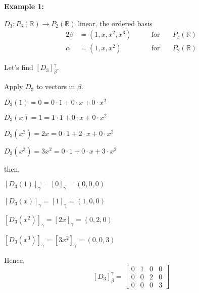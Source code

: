 \documentclass[12pt]{article}
\newcommand{\mR}{{\mathbb{R}}}
\begin{document}
	
	{\color{Brown}
		\textbf{Example 1:}
		
		$D_3 : P_3 (\mR) \to P_2 (\mR)$ linear, the ordered basis
		\begin{alignat*}{2}
			\beta &= (1, x, x^2, x^3) \qquad &\text{for} \quad & P_3(\mR)\\
			\alpha &= (1, x, x^2) \qquad &\text{for} \quad & P_2 (\mR)
		\end{alignat*}

		Let's find $[D_3]^{\gamma}_{\beta} $. 

		Apply $D_3$ to vectors in $\beta$. 
		\begin{description}
			\item $D_3(1) = 0 = 0 \cdot 1 + 0 \cdot x + 0 \cdot x^2$
			\item $D_3(x) = 1 = 1 \cdot 1 + 0 \cdot x + 0 \cdot x^2$
			\item $D_3(x^2) = 2x = 0 \cdot 1 + 2 \cdot x + 0 \cdot x^2$
			\item $D_3(x^3) = 3x^2 = 0 \cdot 1 + 0 \cdot x + 3 \cdot x^2$
		\end{description}
		then, 
		\begin{description}
			\item $[D_3(1)]_{\gamma} = [0]_{\gamma} = (0, 0, 0)$
			\item $[D_3(x)]_{\gamma} = [1]_{\gamma} = (1, 0, 0)$
			\item $[D_3(x^2)]_{\gamma} = [2x]_{\gamma} = (0, 2, 0)$
			\item $[D_3(x^3)]_{\gamma} = [3x^2]_{\gamma} = (0, 0, 3)$
		\end{description}
		Hence, 
		\[
			[D_3]^{\gamma}_{\beta} = 
			\begin{bmatrix}
				0 & 1 & 0 & 0\\
				0 & 0 & 2 & 0\\
				0 & 0 & 0 & 3
			\end{bmatrix}
		\]
	}
	
\end{document}
